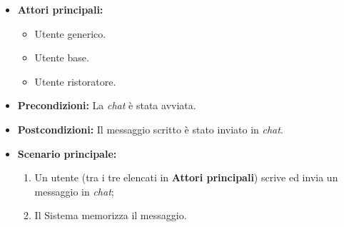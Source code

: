 \label{usecase:Invio messaggio chat}
\begin{itemize}
	\item \textbf{Attori principali:} 
	\begin{itemize}
        \item Utente generico.
        \item Utente base.
        \item Utente ristoratore.
    \end{itemize}

	\item \textbf{Precondizioni:} La \textit{chat} è stata avviata.


	\item \textbf{Postcondizioni:} Il messaggio scritto è stato inviato in \textit{chat}.

	\item \textbf{Scenario principale:}
            \begin{enumerate}
                \item Un utente (tra i tre elencati in \textbf{Attori principali}) scrive ed invia un messaggio in \textit{chat};
                \item Il Sistema memorizza il messaggio.
	      \end{enumerate}
\end{itemize}